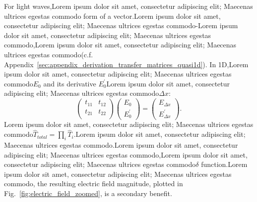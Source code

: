 For light waves,Lorem ipsum dolor sit amet, consectetur adipiscing elit; Maecenas ultrices egestas commodo
form of a vector.Lorem ipsum dolor sit amet, consectetur adipiscing elit; Maecenas ultrices egestas commodo-Lorem ipsum dolor sit amet, consectetur adipiscing elit; Maecenas ultrices egestas commodo,Lorem ipsum dolor sit amet, consectetur adipiscing elit; Maecenas ultrices egestas commodo(c.f. Appendix~\ref{sec:appendix_derivation_transfer_matrices_quasi1d}). In 1D,Lorem ipsum dolor sit amet, consectetur adipiscing elit; Maecenas ultrices egestas commodo$E_0$ and its derivative $E_0^{\prime}$Lorem ipsum dolor sit amet, consectetur adipiscing elit; Maecenas ultrices egestas commodo$\Delta x$:
\begin{equation}
 \left( \begin{array}{cc}
t_{11} & t_{12} \\
t_{21} & t_{22} \\
\end{array} \right)
\left( \begin{array}{c}
E_0 \\
E_0^{\prime}
\end{array} \right)
=
\left( \begin{array}{c}
E_{\Delta x} \\
E_{\Delta x}^{\prime}
\end{array} \right).
\end{equation}
Lorem ipsum dolor sit amet, consectetur adipiscing elit; Maecenas ultrices egestas commodo$\hat{T}_{total} = \prod_i \hat{T}_i$.Lorem ipsum dolor sit amet, consectetur adipiscing elit; Maecenas ultrices egestas commodo.Lorem ipsum dolor sit amet, consectetur adipiscing elit; Maecenas ultrices egestas commodo,Lorem ipsum dolor sit amet, consectetur adipiscing elit; Maecenas ultrices egestas commodo$\delta$ function.Lorem ipsum dolor sit amet, consectetur adipiscing elit; Maecenas ultrices egestas commodo, the resulting electric field magnitude, plotted in Fig.~\ref{fig:electric_field_zoomed}, is a secondary benefit.

